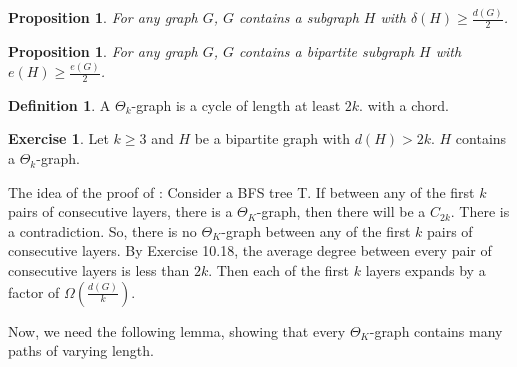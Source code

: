 \documentclass{article}
\newtheorem{proposition}[theorem]{Proposition}
\theoremstyle{definition}
\newtheorem{definition}[theorem]{Definition}
\newtheorem{exercise}[theorem]{Exercise}
\begin{document}
\begin{proposition}
    For any graph $G$, $G$ contains a subgraph $H$ with $\delta(H)\geq \frac{d(G)}{2}$.
\end{proposition}

\begin{proposition}
    For any graph $G$, $G$ contains a bipartite subgraph $H$ with $e(H)\geq \frac{e(G)}{2}$.
\end{proposition}

\begin{definition}
    A $\Theta_k$-graph is a cycle of length at least $2k$. with a chord.
\end{definition}

\begin{exercise}
    Let $k\geq 3$ and $H$ be a bipartite graph with $d(H)>2k$. $H$ contains a $\Theta_k$-graph.
\end{exercise}

The idea of the proof of : Consider a BFS tree T. If between any of the first $k$
pairs of consecutive layers, there is a $\Theta_K$-graph, then there will be a $C_{2k}$. There is a contradiction. So, there is no $\Theta_K$-graph between any of the first $k$ pairs of consecutive layers.
By Exercise 10.18, the average degree between every pair of consecutive layers is less than $2k$. Then each of the first $k$ layers expands by a factor of $\Omega(\frac{d(G)}{k})$.\par
Now, we need the following lemma, showing that every  $\Theta_K$-graph contains many paths of varying length.
\end{document}
